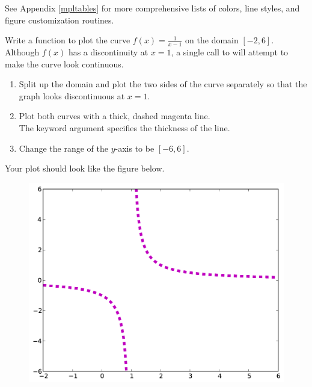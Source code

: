 See Appendix \ref{mpltables} for more comprehensive lists of colors, line styles, and figure customization routines.
    
\begin{problem} %
\label{prob:lineplot}
Write a function to plot the curve $f(x) = \frac{1}{x-1}$ on the domain $[-2,6]$.
Although $f(x)$ has a discontinuity at $x=1$, a single call to  will attempt to make the curve look continuous.
\begin{enumerate}
\item Split up the domain and plot the two sides of the curve separately so that the graph looks discontinuous at $x=1$.
\item Plot both curves with a thick, dashed magenta line.\\
The keyword argument  specifies the thickness of the line.
\item Change the range of the $y$-axis to be $[-6, 6]$.
\end{enumerate}
Your plot should look like the figure below.

\begin{figure}[H]
\includegraphics[width=.7\textwidth]{soln2.pdf}
\end{figure}
\end{problem}

